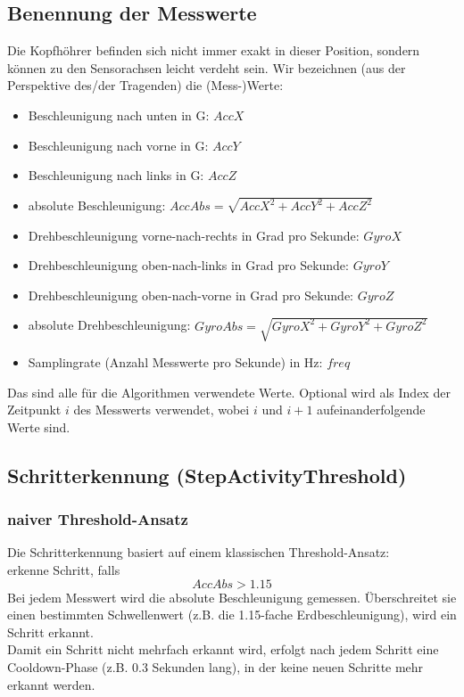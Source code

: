 \documentclass[a4paper,12pt]{article}
\begin{document}
\subsection{Benennung der Messwerte}
Die Kopfhöhrer befinden sich nicht immer exakt in dieser Position, sondern können zu den Sensorachsen leicht verdeht sein. Wir bezeichnen (aus der Perspektive des/der Tragenden) die (Mess-)Werte:
\begin{itemize}
	\item Beschleunigung nach unten in G: $AccX$
	\item Beschleunigung nach vorne in G: $AccY$
	\item Beschleunigung nach links in G: $AccZ$
	\item absolute Beschleunigung: $AccAbs = \sqrt{AccX^2+AccY^2+AccZ^2}$
	\item Drehbeschleunigung vorne-nach-rechts in Grad pro Sekunde: $GyroX$ 
	\item Drehbeschleunigung oben-nach-links in Grad pro Sekunde: $GyroY$ 
	\item Drehbeschleunigung oben-nach-vorne in Grad pro Sekunde: $GyroZ$ 
	\item absolute Drehbeschleunigung: $GyroAbs = \sqrt{GyroX^2+GyroY^2+GyroZ^2}$
	\item Samplingrate (Anzahl Messwerte pro Sekunde) in Hz: $freq$
\end{itemize}
Das sind alle für die Algorithmen verwendete Werte. Optional wird als Index der Zeitpunkt $i$ des Messwerts verwendet, wobei $i$ und $i+1$ aufeinanderfolgende Werte sind.
\subsection{Schritterkennung (StepActivityThreshold)}
\subsubsection{naiver Threshold-Ansatz}
Die Schritterkennung basiert auf einem klassischen Threshold-Ansatz:\\
erkenne Schritt, falls 
\begin{equation}
	AccAbs > 1.15
\end{equation}
Bei jedem Messwert wird die absolute Beschleunigung gemessen. Überschreitet sie einen bestimmten Schwellenwert (z.B. die 1.15-fache Erdbeschleunigung), wird ein Schritt erkannt.\\ 
Damit ein Schritt nicht mehrfach erkannt wird, erfolgt nach jedem Schritt eine Cooldown-Phase (z.B. 0.3 Sekunden lang), in der keine neuen Schritte mehr erkannt werden.
\end{document}
